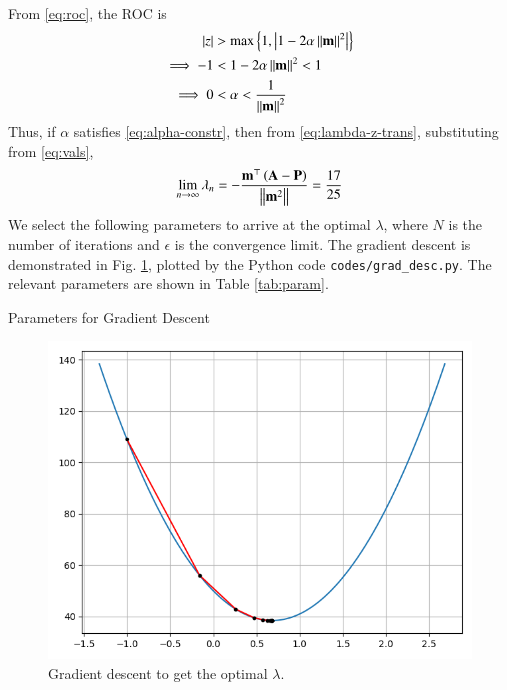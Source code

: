 \documentclass[journal,12pt,twocolumn]{IEEEtran}
\begin{document}
\begin{enumerate}
\begin{align}
        \label{eq:lambda-z-trans}
    \end{align}
    From \eqref{eq:roc}, the ROC is
    \begin{align}
        \left\vert z\right\vert &> \max\left\{1,\left\vert1-2\alpha\left\lVert\mathbf{m}\right\rVert^2\right\vert\right\} \\
        \implies -1 &< 1 - 2\alpha\left\lVert\mathbf{m}\right\rVert^2 < 1 \\
        \implies 0 &< \alpha < \frac{1}{\left\lVert\mathbf{m}\right\rVert^2}
        \label{eq:alpha-constr}
    \end{align}
    Thus, if $\alpha$ satisfies \eqref{eq:alpha-constr}, then from 
    \eqref{eq:lambda-z-trans}, substituting from \eqref{eq:vals},
    \begin{align}
        \lim_{n\to\infty}\lambda_n = -\frac{\mathbf{m}^\top\left(\mathbf{A}-\mathbf{P}\right)}{\left\lVert\mathbf{m}^2\right\rVert} = \frac{17}{25} \label{eq:conv}
    \end{align}
    We select the following parameters to arrive at the optimal $\lambda$,
    where $N$ is the number of iterations and $\epsilon$ is the convergence 
    limit. The gradient descent is demonstrated in Fig. \ref{fig:grad-desc},
    plotted by the Python code \texttt{codes/grad\_desc.py}. The relevant
    parameters are shown in Table \ref{tab:param}.
    \begin{table}[!ht]
        \centering
        
        \caption{Parameters for Gradient Descent}
        \label{tab:param}
    \end{table}

    \begin{figure}[!ht]
        \centering
        \includegraphics[width=\columnwidth]{figs/grad_desc.png}
        \caption{Gradient descent to get the optimal $\lambda$.}
        \label{fig:grad-desc}
    \end{figure}
\end{enumerate}
\end{document}
